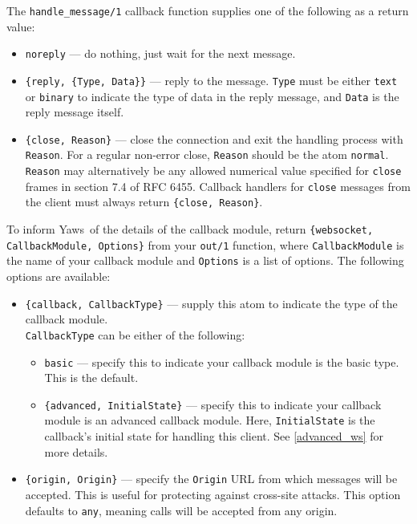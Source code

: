 \documentclass[11pt,oneside,english]{book}
\newcommand{\Yaws}            %
        {{\sc Yaws}}
\begin{document}
The \verb+handle_message/1+ callback function supplies one of the
following as a return value:

\begin{itemize}

\item \verb+noreply+ --- do nothing, just wait for the next message.

\item \verb+{reply, {Type, Data}}+ --- reply to the
  message. \verb+Type+ must be either \verb+text+ or \verb+binary+ to
  indicate the type of data in the reply message, and \verb+Data+ is
  the reply message itself.

\item \verb+{close, Reason}+ --- close the connection and exit the
  handling process with \verb+Reason+. For a regular non-error close,
  \verb+Reason+ should be the atom \verb+normal+. \verb+Reason+ may
  alternatively be any allowed numerical value specified for
  \verb+close+ frames in section 7.4 of RFC 6455. Callback handlers
  for \verb+close+ messages from the client must always return
  \verb+{close, Reason}+.

\end{itemize}

To inform \Yaws\ of the details of the callback module, return
\verb+{websocket, CallbackModule, Options}+ from your \verb+out/1+
function, where \verb+CallbackModule+ is the name of your callback
module and \verb+Options+ is a list of options. The following options
are available:

\begin{itemize}

\item \verb+{callback, CallbackType}+ --- supply this atom to indicate
  the type of the callback module. \\ \verb+CallbackType+ can be
  either of the following:

\begin{itemize}

\item \verb+basic+ --- specify this to indicate your callback module
  is the basic type. This is the default.

\item \verb+{advanced, InitialState}+ --- specify this to indicate
  your callback module is an advanced callback module. Here,
  \verb+InitialState+ is the callback's initial state for handling
  this client. See \ref{advanced_ws} for more details.

\end{itemize}

\item \verb+{origin, Origin}+ --- specify the \verb+Origin+ URL from
  which messages will be accepted. This is useful for protecting
  against cross-site attacks. This option defaults to \verb+any+,
  meaning calls will be accepted from any origin.

\end{itemize}
\end{document}
